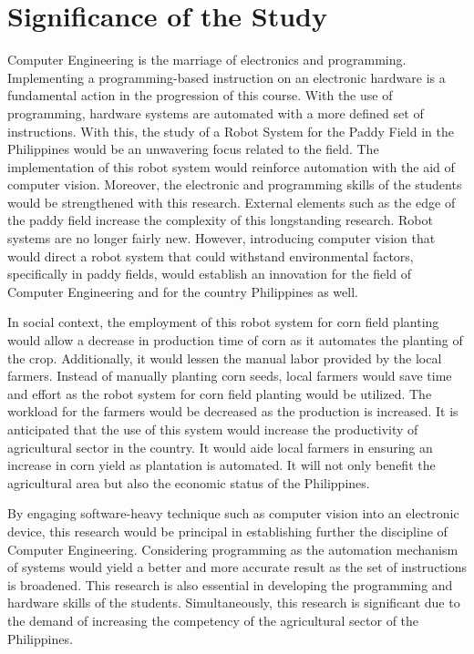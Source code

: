 \section{Significance of the Study}
 
Computer Engineering is the marriage of electronics and programming. Implementing a programming-based instruction on an electronic hardware is a fundamental action in the progression of this course. With the use of programming, hardware systems are automated with a more defined set of instructions. With this, the study of a Robot System for the Paddy Field in the Philippines would be an unwavering focus related to the field. The implementation of this robot system would reinforce automation with the aid of computer vision. Moreover, the electronic and programming skills of the students would be strengthened with this research. External elements such as the edge of the paddy field increase the complexity of this longstanding research. Robot systems are no longer fairly new. However, introducing computer vision that would direct a robot system that could withstand environmental factors, specifically in paddy fields, would establish an innovation for the field of Computer Engineering and for the country Philippines as well.
 
In social context, the employment of this robot system for corn field planting would allow a decrease in production time of corn as it automates the planting of the crop. Additionally, it would lessen the manual labor provided by the local farmers. Instead of manually planting corn seeds, local farmers would save time and effort as the robot system for corn field planting would be utilized. The workload for the farmers would be decreased as the production is increased. It is anticipated that the use of this system would increase the productivity of agricultural sector in the country. It would aide local farmers in ensuring an increase in corn yield as plantation is automated. It will not only benefit the agricultural area but also the economic status of the Philippines.
 
By engaging software-heavy technique such as computer vision into an electronic device, this research would be principal in establishing further the discipline of Computer Engineering. Considering programming as the automation mechanism of systems would yield a better and more accurate result as the set of instructions is broadened. This research is also essential in developing the programming and hardware skills of the students. Simultaneously, this research is significant due to the demand of increasing the competency of the agricultural sector of the Philippines.

